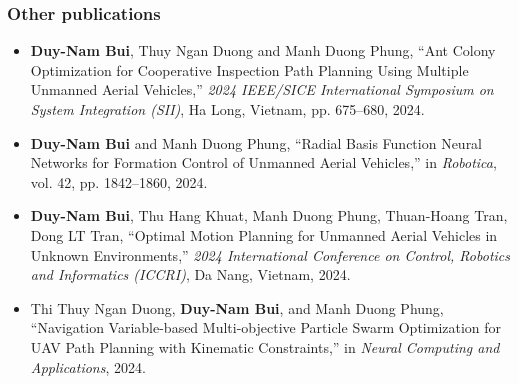 \subsubsection{Other publications}
\begin{itemize}
    \item \textbf{Duy-Nam Bui}, Thuy Ngan Duong and Manh Duong Phung, ``Ant Colony Optimization for Cooperative Inspection Path Planning Using Multiple Unmanned Aerial Vehicles,'' \textit{2024 IEEE/SICE International Symposium on System Integration (SII)}, Ha Long, Vietnam, pp. 675--680, 2024.
        \item \textbf{Duy-Nam Bui} and Manh Duong Phung, ``Radial Basis Function Neural Networks for Formation Control of Unmanned Aerial Vehicles,'' in \textit{Robotica}, vol. 42, pp. {1842--1860}, 2024.
    \item \textbf{Duy-Nam Bui}, Thu Hang Khuat, Manh Duong Phung, Thuan-Hoang Tran, Dong LT Tran, ``Optimal Motion Planning for Unmanned Aerial Vehicles in Unknown Environments,'' \textit{2024 International Conference on Control, Robotics and Informatics (ICCRI)}, Da Nang, Vietnam, 2024.
        \item Thi Thuy Ngan Duong, \textbf{Duy-Nam Bui}, and Manh Duong Phung, ``Navigation Variable-based Multi-objective Particle Swarm Optimization for UAV Path Planning with Kinematic Constraints,'' in \textit{Neural Computing and Applications}, 2024.
\end{itemize}



